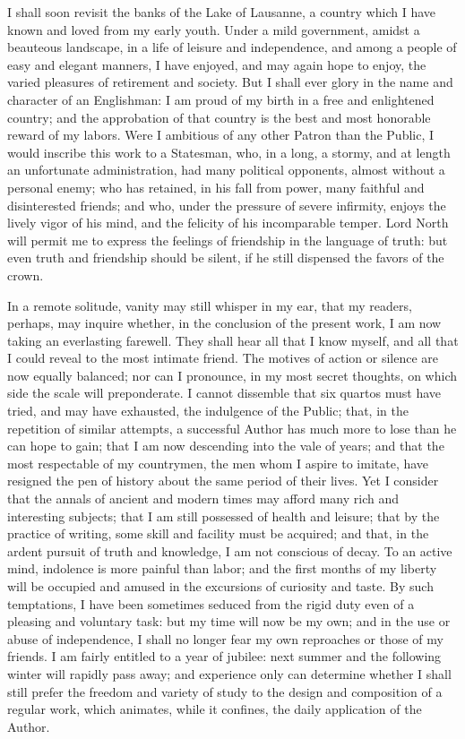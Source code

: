 
  I shall soon revisit the banks of the Lake of Lausanne, a country which I have known and loved from my early youth. Under a mild government, amidst a beauteous landscape, in a life of leisure and independence, and among a people of easy and elegant manners, I have enjoyed, and may again hope to enjoy, the varied pleasures of retirement and society. But I shall ever glory in the name and character of an Englishman: I am proud of my birth in a free and enlightened country; and the approbation of that country is the best and most honorable reward of my labors. Were I ambitious of any other Patron than the Public, I would inscribe this work to a Statesman, who, in a long, a stormy, and at length an unfortunate administration, had many political opponents, almost without a personal enemy; who has retained, in his fall from power, many faithful and disinterested friends; and who, under the pressure of severe infirmity, enjoys the lively vigor of his mind, and the felicity of his incomparable temper. Lord North will permit me to express the feelings of friendship in the language of truth: but even truth and friendship should be silent, if he still dispensed the favors of the crown.

In a remote solitude, vanity may still whisper in my ear, that my readers, perhaps, may inquire whether, in the conclusion of the present work, I am now taking an everlasting farewell. They shall hear all that I know myself, and all that I could reveal to the most intimate friend. The motives of action or silence are now equally balanced; nor can I pronounce, in my most secret thoughts, on which side the scale will preponderate. I cannot dissemble that six quartos must have tried, and may have exhausted, the indulgence of the Public; that, in the repetition of similar attempts, a successful Author has much more to lose than he can hope to gain; that I am now descending into the vale of years; and that the most respectable of my countrymen, the men whom I aspire to imitate, have resigned the pen of history about the same period of their lives. Yet I consider that the annals of ancient and modern times may afford many rich and interesting subjects; that I am still possessed of health and leisure; that by the practice of writing, some skill and facility must be acquired; and that, in the ardent pursuit of truth and knowledge, I am not conscious of decay. To an active mind, indolence is more painful than labor; and the first months of my liberty will be occupied and amused in the excursions of curiosity and taste. By such temptations, I have been sometimes seduced from the rigid duty even of a pleasing and voluntary task: but my time will now be my own; and in the use or abuse of independence, I shall no longer fear my own reproaches or those of my friends. I am fairly entitled to a year of jubilee: next summer and the following winter will rapidly pass away; and experience only can determine whether I shall still prefer the freedom and variety of study to the design and composition of a regular work, which animates, while it confines, the daily application of the Author.

